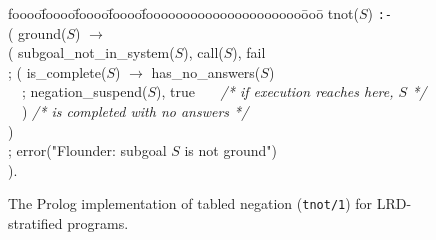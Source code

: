\begin{figure}[hbt]
\longline
\begin{sf}
\begin{tabbing}
foooo\=foooo\=foooo\=foooo\=fooooooooooooooooooooo\=ooo\=\kill
\> tnot($S$) {\tt :-} \\
\> \> ( ground($S$) $\rightarrow$ \\
\> \> \> ( subgoal\_not\_in\_system($S$), call($S$), fail \\
\> \> \> ;   ( is\_complete($S$) $\rightarrow$ has\_no\_answers($S$) \\
\> \> \> \ \ ; negation\_suspend($S$), true \ \ \ 
			{\em /* if execution reaches here, $S$ */} \\
\> \> \> \ \ ) \> \>		{\em /* is completed with no answers */}\\
\> \> \> ) \\
\> \> ; error("Flounder: subgoal $S$ is not ground") \\
\> \> ).
\end{tabbing}
\longline
\end{sf}
\caption{The Prolog implementation of tabled negation ({\tt tnot/1})
	 for LRD-stratified programs.}
\label{fig:tnot}
\end{figure}
